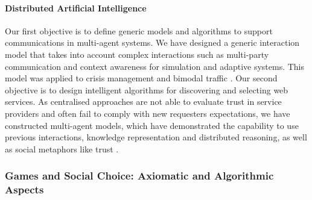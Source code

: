 \paragraph{Distributed Artificial Intelligence}

Our first objective is  to define generic models and algorithms to support communications in multi-agent systems.
We have designed a generic interaction model that takes into account complex
interactions such as multi-party communication and context awareness for
simulation and adaptive systems. 
This model was applied to crisis management and bimodal traffic
\cite{BalboBP2016}.
Our second objective is to design intelligent algorithms for discovering and selecting web services. 
As centralised approaches
are not able to evaluate trust in service providers and
often fail to comply with new requesters expectations, 
we have constructed multi-agent models, which have demonstrated the capability to use
previous interactions, knowledge representation and distributed reasoning, as
well as social metaphors like trust \cite{Louati2015A-1250421}.



\subsubsection{Games and Social Choice: Axiomatic and Algorithmic Aspects}


